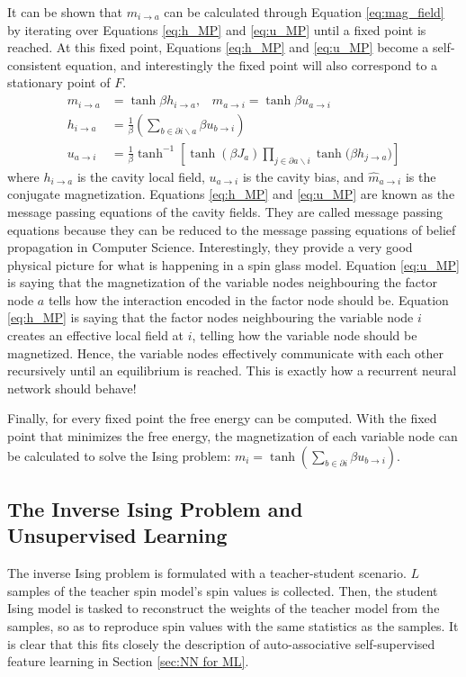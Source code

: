 \documentclass[%
 reprint,
 amsmath,amssymb,
 aps,
]{revtex4-2}
\begin{document}
It can be shown \cite{huang2021statistical_cavity_MP} that $m_{i\rightarrow a}$ can be calculated through Equation \ref{eq:mag_field} by iterating over Equations \ref{eq:h_MP} and \ref{eq:u_MP} until a fixed point is reached. At this fixed point, Equations \ref{eq:h_MP} and \ref{eq:u_MP} become a self-consistent equation, and interestingly the fixed point will also correspond to a stationary point of $F$. 
\begin{align}
m_{i\rightarrow a}&=\tanh{\beta h_{i\rightarrow a}}, \; \; \; \hat{m}_{a\rightarrow i}=\tanh{\beta u_{a\rightarrow i}} \label{eq:mag_field} \\
h_{i \rightarrow a}&=\frac{1}{\beta}\left( \sum_{b\in \partial i \backslash a} \beta u_{b \rightarrow i} \right) \label{eq:h_MP}\\
u_{a\rightarrow i}&=\frac{1}{\beta}\tanh^{-1}{\left[ \tanh{(\beta J_a)} \prod_{j \in \partial a \backslash i} \tanh{(\beta h_{j\rightarrow a}}) \right]} \label{eq:u_MP}
\end{align}
where $h_{i \rightarrow a}$ is the cavity local field, $u_{a\rightarrow i}$ is the cavity bias, and $\hat{m}_{a\rightarrow i}$ is the conjugate magnetization. Equations \ref{eq:h_MP} and \ref{eq:u_MP} are known as the message passing equations of the cavity fields. They are called message passing equations because they can be reduced to the message passing equations of belief propagation in Computer Science. Interestingly, they provide a very good physical picture for what is happening in a spin glass model. Equation \ref{eq:u_MP} is saying that the magnetization of the variable nodes neighbouring the factor node $a$ tells how the interaction encoded in the factor node should be. Equation \ref{eq:h_MP} is saying that the factor nodes neighbouring the variable node $i$ creates an effective local field at $i$, telling how the variable node should be magnetized. Hence, the variable nodes effectively communicate with each other recursively until an equilibrium is reached. This is exactly how a recurrent neural network should behave!

Finally, for every fixed point the free energy can be computed. With the fixed point that minimizes the free energy, the magnetization of each variable node can be calculated to solve the Ising problem:
$m_{i}=\tanh{\left( \sum_{b\in \partial i} \beta u_{b \rightarrow i} \right)}$.


\subsection{The Inverse Ising Problem and \\ Unsupervised Learning}
The inverse Ising problem \cite{huang2021statistical_inv_Ising} is formulated with a teacher-student scenario. $L$ samples of the teacher spin model's spin values is collected. Then, the student Ising model is tasked to reconstruct the weights of the teacher model from the samples, so as to reproduce spin values with the same statistics as the samples. It is clear that this fits closely the description of auto-associative self-supervised feature learning in Section \ref{sec:NN for ML}. 
\end{document}
